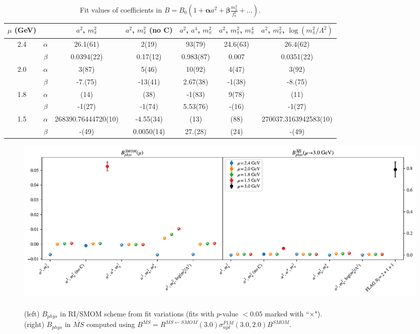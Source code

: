\documentclass[12pt]{extarticle}
\begin{document}
\begin{table}[h!]
\begin{center}
\begin{tabular}{|c c|c|c|c|c|c|}
\hline
$\mu$ (GeV) &  & $a^2$, $m_\pi^2$& $a^2$, $m_\pi^2$ (no C)& $a^2$, $a^4$, $m_\pi^2$& $a^2$, $m_\pi^2$, $m_\pi^4$& $a^2$, $m_\pi^2$, $\log(m_\pi^2/\Lambda^2)$\\
\hline
\multirow{2}{0.5in}{2.4} & $\alpha$ & 26.1(61)& 2(19)& 93(79)& 24.6(63)& 26.4(62)\\
 & $\beta$ & 0.0394(22)& 0.17(12)& 0.983(87)& 0.007& 0.0351(22)\\
\hline
\multirow{2}{0.5in}{2.0} & $\alpha$ & 3(87)& 5(46)& 10(92)& 4(47)& 3(92)\\
 & $\beta$ & -7.(75)& -13(41)& 2.67(38)& -1(38)& -8.(75)\\
\hline
\multirow{2}{0.5in}{1.8} & $\alpha$ & (14)& (38)& -1(83)& 9(78)& (11)\\
 & $\beta$ & -1(27)& -1(74)& 5.53(76)& -(16)& -1(27)\\
\hline
\multirow{2}{0.5in}{1.5} & $\alpha$ & 268390.76444720(10)& -4.55(34)& (13)& (88)& 270037.3163942583(10)\\
 & $\beta$ & -(49)& 0.0050(14)& 27.(28)& (24)& -(49)\\
\hline
\end{tabular}
\caption{Fit values of coefficients in $B = B_0(1 + \mathbf{\alpha} a^2 + \mathbf{\beta} \frac{m_\pi^2}{f_\pi^2} + \ldots)$.}
\end{center}
\end{table}
\begin{figure}
\centering
\includegraphics[page=1, width=1.1\textwidth]{plots/SSmPP_fit_summary.pdf}
\caption{\\(left) $B_{phys}$ in RI/SMOM scheme from fit variations (fits with $p$-value $<0.05$ marked with ``$\times$"). \\(right) $B_{phys}$ in $\overline{MS}$ computed using $B^{\overline{MS}} = R^{\overline{MS}\leftarrow SMOM}(3.0)\sigma_{npt}^{F1M}(3.0, 2.0) B^{SMOM}$.}
\end{figure}
\end{document}

